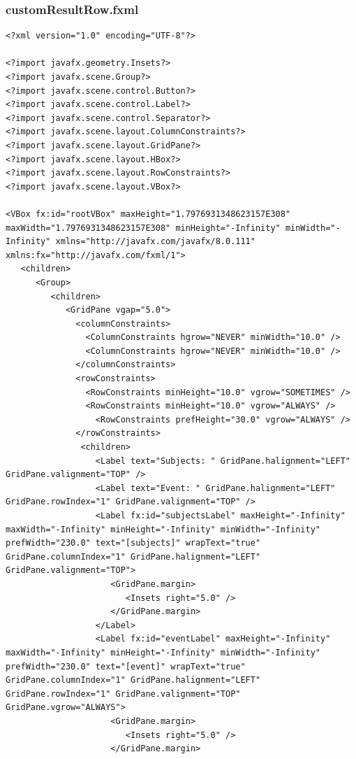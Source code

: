 \subsubsection{customResultRow.fxml}
\begin{lstlisting}
<?xml version="1.0" encoding="UTF-8"?>

<?import javafx.geometry.Insets?>
<?import javafx.scene.Group?>
<?import javafx.scene.control.Button?>
<?import javafx.scene.control.Label?>
<?import javafx.scene.control.Separator?>
<?import javafx.scene.layout.ColumnConstraints?>
<?import javafx.scene.layout.GridPane?>
<?import javafx.scene.layout.HBox?>
<?import javafx.scene.layout.RowConstraints?>
<?import javafx.scene.layout.VBox?>

<VBox fx:id="rootVBox" maxHeight="1.7976931348623157E308" maxWidth="1.7976931348623157E308" minHeight="-Infinity" minWidth="-Infinity" xmlns="http://javafx.com/javafx/8.0.111" xmlns:fx="http://javafx.com/fxml/1">
   <children>
      <Group>
         <children>
            <GridPane vgap="5.0">
              <columnConstraints>
                <ColumnConstraints hgrow="NEVER" minWidth="10.0" />
                <ColumnConstraints hgrow="NEVER" minWidth="10.0" />
              </columnConstraints>
              <rowConstraints>
                <RowConstraints minHeight="10.0" vgrow="SOMETIMES" />
                <RowConstraints minHeight="10.0" vgrow="ALWAYS" />
                  <RowConstraints prefHeight="30.0" vgrow="ALWAYS" />
              </rowConstraints>
               <children>
                  <Label text="Subjects: " GridPane.halignment="LEFT" GridPane.valignment="TOP" />
                  <Label text="Event: " GridPane.halignment="LEFT" GridPane.rowIndex="1" GridPane.valignment="TOP" />
                  <Label fx:id="subjectsLabel" maxHeight="-Infinity" maxWidth="-Infinity" minHeight="-Infinity" minWidth="-Infinity" prefWidth="230.0" text="[subjects]" wrapText="true" GridPane.columnIndex="1" GridPane.halignment="LEFT" GridPane.valignment="TOP">
                     <GridPane.margin>
                        <Insets right="5.0" />
                     </GridPane.margin>
                  </Label>
                  <Label fx:id="eventLabel" maxHeight="-Infinity" maxWidth="-Infinity" minHeight="-Infinity" minWidth="-Infinity" prefWidth="230.0" text="[event]" wrapText="true" GridPane.columnIndex="1" GridPane.halignment="LEFT" GridPane.rowIndex="1" GridPane.valignment="TOP" GridPane.vgrow="ALWAYS">
                     <GridPane.margin>
                        <Insets right="5.0" />
                     </GridPane.margin>

\end{lstlisting}
